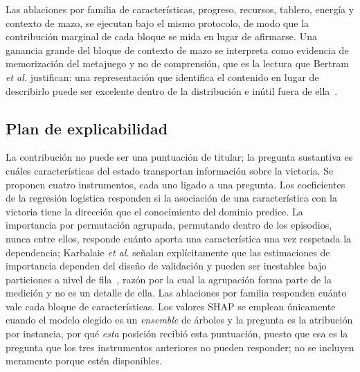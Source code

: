 \documentclass[conference]{IEEEtran}
\begin{document}
Las ablaciones por familia de caracter\'isticas, progreso, recursos,
tablero, energ\'ia y contexto de mazo, se ejecutan bajo el mismo
protocolo, de modo que la contribuci\'on marginal de cada bloque se mida en
lugar de afirmarse. Una ganancia grande del bloque de contexto de mazo se
interpreta como evidencia de memorizaci\'on del metajuego y no de
comprensi\'on, que es la lectura que Bertram \textit{et al.} justifican: una
representaci\'on que identifica el contenido en lugar de describirlo puede
ser excelente dentro de la distribuci\'on e in\'util fuera de
ella~\cite{bertram_cardrepresentations_2024}.

\subsection{Plan de explicabilidad}
\label{subsec:explainability}
La contribuci\'on no puede ser una puntuaci\'on de titular; la pregunta
sustantiva es cu\'ales caracter\'isticas del estado transportan informaci\'on
sobre la victoria. Se proponen cuatro instrumentos, cada uno ligado a una
pregunta. Los coeficientes de la regresi\'on log\'istica responden si la
asociaci\'on de una caracter\'istica con la victoria tiene la direcci\'on que
el conocimiento del dominio predice. La importancia por permutaci\'on
agrupada, permutando dentro de los episodios, nunca entre ellos,
responde cu\'anto aporta una caracter\'istica una vez respetada la
dependencia; Karbalaie \textit{et al.} se\~nalan expl\'icitamente que las
estimaciones de importancia dependen del dise\~no de validaci\'on y pueden
ser inestables bajo particiones a nivel de
fila~\cite{karbalaie_participantaware_2026}, raz\'on por la cual la
agrupaci\'on forma parte de la medici\'on y no es un detalle de ella. Las
ablaciones por familia responden cu\'anto vale cada bloque de
caracter\'isticas. Los valores SHAP se emplean \'unicamente cuando el modelo
elegido es un \emph{ensemble} de \'arboles y la pregunta es la atribuci\'on
por instancia, por qu\'e \emph{esta} posici\'on recibi\'o esta
puntuaci\'on, puesto que esa es la pregunta que los tres instrumentos
anteriores no pueden responder; no se incluyen meramente porque est\'en
disponibles.
\end{document}
